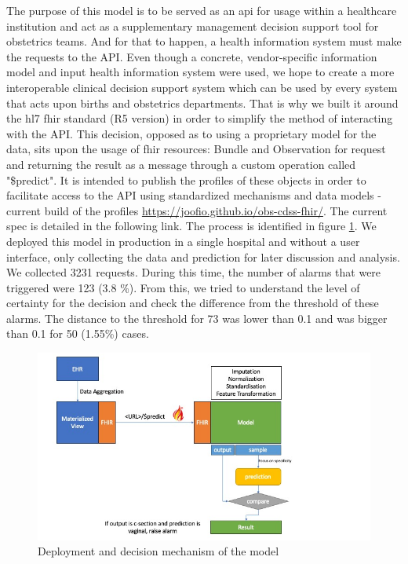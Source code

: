 The purpose of this model is to be served as an \ac{api} for usage within a healthcare institution and act as a supplementary management decision support tool for obstetrics teams. And for that to happen, a health information system must make the requests to the API. Even though a concrete, vendor-specific information model and input health information system were used, we hope to create a more interoperable clinical decision support system which can be used by every system that acts upon births and obstetrics departments. That is why we built it around the \ac{hl7} \ac{fhir} standard (R5 version) in order to simplify the method of interacting with the API. This decision, opposed as to using a proprietary model for the data, sits upon the usage of \ac{fhir} resources: Bundle and Observation for request and returning the result as a message through a custom operation called "\$predict". It is intended to publish the profiles of these objects in order to facilitate access to the API using standardized mechanisms and data models - current build of the profiles \url{https://joofio.github.io/obs-cdss-fhir/}. The current spec is detailed in the following link. The process is identified in figure \ref{fig:deploy}.
We deployed this model in production in a single hospital and without a user interface, only collecting the data and prediction for later discussion and analysis. We collected 3231 requests. During this time, the number of alarms that were triggered were 123 (3.8 \%). From this, we tried to understand the level of certainty for the decision and check the difference from the threshold of these alarms. The distance to the threshold for 73 was lower than 0.1 and was bigger than 0.1 for 50 (1.55\%) cases.

\begin{figure}[htbp]
\centering
\captionsetup{justification=centering}
\caption{Deployment and decision mechanism of the model}\label{fig:deploy} 
\includegraphics[scale=0.60]{figures/obs-model.jpg}
\end{figure}


